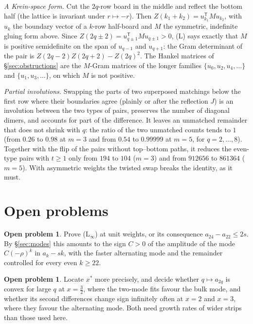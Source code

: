 \documentclass[11pt]{amsart}
\theoremstyle{definition}
\newtheorem{problem}[theorem]{Open problem}
\theoremstyle{remark}
\begin{document}
\emph{A Krein-space form.} Cut the $2q$-row board in the middle and reflect the bottom half (the
lattice is invariant under $r \mapsto -r$). Then $Z(k_1 + k_2) = u_{k_1}^{\mathsf T} M u_{k_2}$,
with $u_k$ the boundary vector of a $k$-row half-board and $M$ the symmetric, indefinite gluing form
above. Since $Z(2q \pm 2) = u_{q \pm 1}^{\mathsf T} M u_{q \pm 1} > 0$, (L) says exactly that $M$ is
positive semidefinite on the span of $u_{q-1}$ and $u_{q+1}$: the Gram determinant of the pair is
$Z(2q-2)Z(2q+2) - Z(2q)^2$. The Hankel matrices of \S\ref{sec:obstructions} are the $M$-Gram matrices
of the longer families $\{u_0, u_2, u_4, \dots\}$ and $\{u_1, u_3, \dots\}$, on which $M$ is not
positive.

\emph{Partial involutions.} Swapping the parts of two superposed matchings below the first row
where their boundaries agree (plainly or after the reflection $J$) is an involution between the
two types of pairs, preserves the number of diagonal dimers, and accounts for part of the
difference. It leaves an unmatched remainder that does not shrink with $q$: the ratio of the two
unmatched counts tends to $1$ (from $0.26$ to $0.98$ at $m = 3$ and from $0.54$ to $0.99999$ at
$m = 5$, for $q = 2, \dots, 8$). Together with the flip of the pairs without top--bottom paths, it
reduces the even-type pairs with $t \ge 1$ only from $194$ to $104$ ($m = 3$) and from $912656$ to
$861364$ ($m = 5$). With asymmetric weights the twisted swap breaks the identity, as it must.

\section{Open problems}

\begin{problem}
Prove (L$_\infty$) at unit weights, or its consequence $a_{24} - a_{22} \le 2s$. By
\S\ref{sec:modes} this amounts to the sign $C > 0$ of the amplitude of the mode $C(-\rho)^k$ in
$a_k - sk$, with the faster alternating mode and the remainder controlled for every even $k \ge 22$.
\end{problem}

\begin{problem}
Locate $x^*$ more precisely, and decide whether $q \mapsto a_{2q}$ is convex for large $q$ at
$x = \frac32$, where the two-mode fits favour the bulk mode, and whether its second differences
change sign infinitely often at $x = 2$ and $x = 3$, where they favour the alternating mode. Both
need growth rates of wider strips than those used here.
\end{problem}
\end{document}
